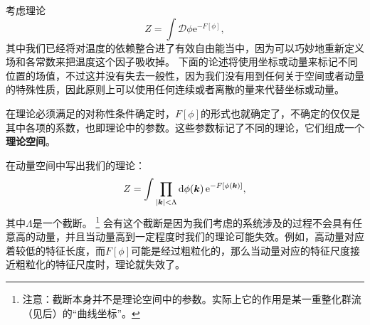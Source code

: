 \documentclass[hyperref, UTF8, a4paper]{ctexart}
\newcommand*{\ee}{\mathrm{e}}
\newcommand*{\fd}[1]{\mathcal{D}{#1}}
\begin{document}
考虑理论
\[
    Z = \int \fd{\phi} \ee^{- F[\phi]},
\]
其中我们已经将对温度的依赖整合进了有效自由能当中，因为可以巧妙地重新定义场和各常数来把温度这个因子吸收掉。
下面的论述将使用坐标或动量来标记不同位置的场值，不过这并没有失去一般性，因为我们没有用到任何关于空间或者动量的特殊性质，因此原则上可以使用任何连续或者离散的量来代替坐标或动量。

在理论必须满足的对称性条件确定时，$F[\phi]$的形式也就确定了，不确定的仅仅是其中各项的系数，也即理论中的参数。这些参数标记了不同的理论，它们组成一个\textbf{理论空间}。

在动量空间中写出我们的理论：
\begin{equation}
    Z = \int \prod_{\abs{\vb*{k}} < \Lambda} \dd{\phi(\vb*{k})} \ee^{ - F[\phi(\vb*{k})]},
    \label{eq:theory-in-momentum-space}
\end{equation}
其中$\Lambda$是一个截断。%
\footnote{注意：截断本身并不是理论空间中的参数。实际上它的作用是某一重整化群流（见后）的“曲线坐标”。}%
会有这个截断是因为我们考虑的系统涉及的过程不会具有任意高的动量，并且当动量高到一定程度时我们的理论可能失效。例如，高动量对应着较低的特征长度，而$F[\phi]$可能是经过粗粒化的，那么当动量对应的特征尺度接近粗粒化的特征尺度时，理论就失效了。
\end{document}
